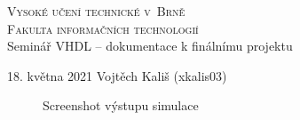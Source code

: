 \documentclass[a4paper, 11pt]{article}
\begin{document}
	\begin{titlepage}
		\begin{center}
			\LARGE\textsc{Vysoké učení technické v~Brně} \\
			\Large\textsc{Fakulta informačních technologií}\\
			\Large{Seminář VHDL -- dokumentace k finálnímu projektu}
		\end{center}

		\Large{18. května 2021 \hfill Vojtěch Kališ (xkalis03)}
	\end{titlepage}

	\begin{figure}[h]
		\centering
		\caption{Screenshot výstupu simulace}
		\label{obr}
	\end{figure}
\end{document}
